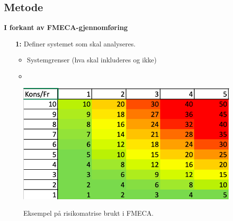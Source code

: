 \subsection{Metode}

\textbf{I forkant av FMECA-gjennomføring}

\begin{itemize}
    \item[\textbf{1:}] Definer systemet som skal analyseres.
    \begin{itemize}
        \item Systemgrenser (hva skal inkluderes og ikke)
        \item 
    \end{itemize}
\end{itemize}



\begin{figure}[H]
    \centering
        \includegraphics[width=\textwidth]{figures/FMECA/Skjermbilde 2021-11-24 kl. 09.47.58.png}\\
        \caption{Eksempel på risikomatrise brukt i FMECA.}
\end{figure}